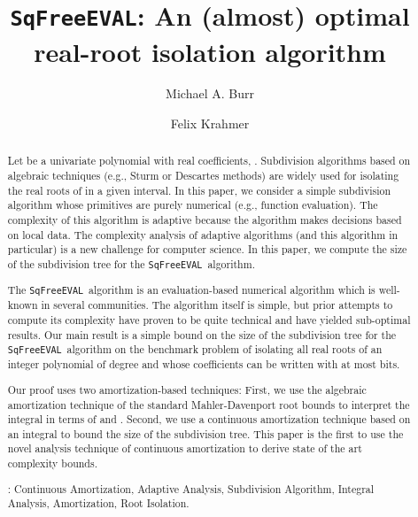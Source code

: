 \documentclass{amsart}
\theoremstyle{definition}
\newcommand{\EVAL}{\texttt{SqFreeEVAL}}
\begin{document}
\title{\EVAL: An (almost) optimal real-root isolation algorithm}

\author{Michael A. Burr}
\address{Fordham University, 441 East Fordham Road, Bronx, NY 10458, USA}

\author{Felix Krahmer}
\address{Hausdorff Center for Mathematics, Universit\"at Bonn, Endenicher Allee 60, 53115 Bonn, Germany}

\begin{abstract}
Let  be a univariate polynomial with real coefficients, .  Subdivision algorithms based on algebraic techniques (e.g., Sturm or Descartes methods) are widely used for isolating the real roots of  in a given interval. In this paper, we consider a simple subdivision algorithm whose primitives are purely numerical (e.g., function evaluation).  The complexity of this algorithm is adaptive because the algorithm makes decisions based on local data.  The complexity analysis of adaptive algorithms (and this algorithm in particular) is a new challenge for computer science. In this paper, we compute the size of the subdivision tree for the \EVAL\ algorithm.

The \EVAL\ algorithm is an evaluation-based numerical algorithm which is well-known in several communities.  The algorithm itself is simple, but prior attempts to compute its complexity have proven to be quite technical and have yielded sub-optimal results.  Our main result is a simple  bound on the size of the subdivision tree for the \EVAL\ algorithm on the benchmark problem of isolating all real roots of an integer polynomial  of degree  and whose coefficients can be written with at most  bits.

Our proof uses two amortization-based techniques: First, we use the algebraic amortization technique of the standard Mahler-Davenport root bounds to interpret the integral in terms of  and .  Second, we use a continuous amortization technique based on an integral to bound the size of the subdivision tree.  This paper is the first to use the novel analysis technique of continuous amortization to derive state of the art complexity bounds.

: Continuous Amortization, Adaptive Analysis, Subdivision Algorithm, Integral Analysis, Amortization, Root Isolation.
\end{abstract}

\maketitle
\end{document}
